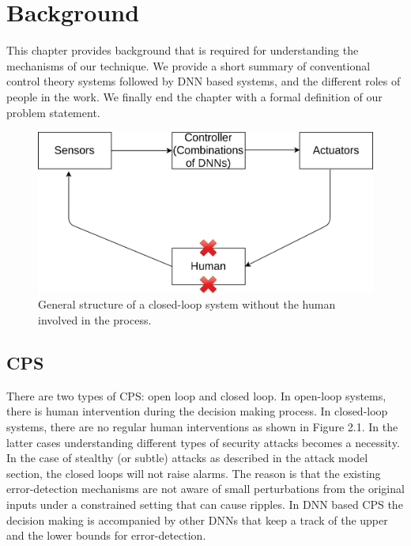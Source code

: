 \chapter{Background}
\label{ch:Chapter2}

This chapter provides background that is required for understanding the mechanisms of our technique. We provide a short summary of conventional control theory systems followed by DNN based systems, and the different roles of people in the work. We finally end the chapter with a formal definition of our problem statement. 




\begin{figure}
	\centering
	\includegraphics[width=0.7\linewidth]{Images/Systemsdescription}
	\caption[Closed-loop system]{General structure of a closed-loop system without the human involved in the process.}
	\label{fig:systemsdescription}
\end{figure}

\section{\ac{CPS}}
There are two types of CPS: open loop and closed loop. In open-loop systems, there is human intervention during the decision making process. In closed-loop systems, there are no regular human interventions as shown in Figure 2.1. In the latter cases understanding different types of security attacks becomes a necessity. In the case of stealthy (or subtle) attacks as described in the attack model section, the closed loops will not raise alarms. The reason is that the existing error-detection mechanisms are not aware of small perturbations from the original inputs under a constrained setting that can cause ripples. In DNN based CPS the decision making is accompanied by other DNNs that keep a track of the upper and the lower bounds for error-detection. 


